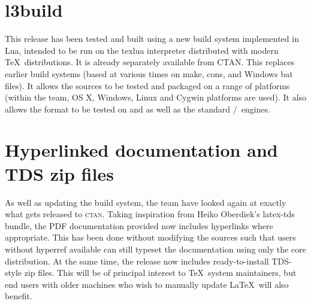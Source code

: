 \documentclass{ltnews}
\begin{document}
\section{l3build}

This release has been tested and built using a new build system implemented in
\textsf{Lua}, intended to be run on the \textsf{texlua} interpreter distributed
with modern \TeX\ distributions. It is already separately available
from CTAN. This replaces earlier build systems (based at various times on
\textsf{make}, \textsf{cons}, and Windows \textsf{bat} files). It allows the
sources to be tested and packaged on a range of platforms (within the team,
OS X, Windows, Linux and Cygwin platforms are used). It also allows the
format to be tested on  and  as well as the
standard /\eTeX\ engines.

\section{Hyperlinked documentation and TDS zip files}

As well as updating the build system, the team have looked again at exactly
what gets released to \textsc{ctan}. Taking inspiration from Heiko Oberdiek's
\textsf{latex-tds} bundle, the PDF documentation provided now includes
hyperlinks where appropriate. This has been done without modifying the sources
such that users without \textsf{hyperref} available can still typeset the
documentation using only the core distribution. At the same time, the release
now includes ready-to-install TDS-style zip files. This will be of principal
interest to \TeX\ system maintainers, but end users with older machines who
wish to manually update \LaTeX\ will also benefit.
\end{document}
